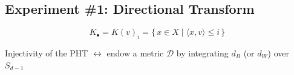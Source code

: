 \documentclass[
  letterpaper,
  DIV=11,
  numbers=noendperiod,
  oneside]{scrartcl}
\begin{document}
\begin{figure}

\begin{minipage}[t]{0.50\linewidth}

{\centering 


}

\end{minipage}%
%
\begin{minipage}[t]{0.50\linewidth}

{\centering 


}

\end{minipage}%

\end{figure}

\hypertarget{experiment-1-directional-transform-3}{%
\subsection{Experiment \#1: Directional
Transform}\label{experiment-1-directional-transform-3}}

\[
K_\bullet = K(v)_i = \{\, x \in X \mid \langle x, v \rangle \leq i  \,\}
\]

Injectivity of the PHT \(\leftrightarrow\) endow a metric
\(\mathcal{D}\) by integrating \(d_B\) (or \(d_W\)) over \(S_{d-1}\)
\end{document}
